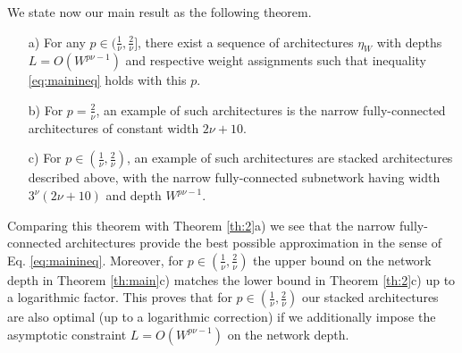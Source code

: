 \documentclass[final, 12pt]{colt2018}
\begin{document}
We state now our main result as the following theorem.

\begin{theorem}\label{th:main}{}\hfill
\begin{enumerate}
\item[a)] 
For any $p\in (\frac{1}{\nu},\frac{2}{\nu}]$, there exist a sequence of architectures $\eta_W$ with depths $L=O(W^{p\nu-1})$ and respective weight assignments such that inequality \eqref{eq:mainineq} holds with this $p$. 
\item[b)] For $p=\frac{2}{\nu}$, an example of such architectures is the  narrow fully-connected architectures of constant width $2\nu+10$.
\item[c)] For $p\in(\frac{1}{\nu},\frac{2}{\nu})$, an example of such architectures are stacked architectures described above, with the narrow fully-connected subnetwork having width $3^\nu(2\nu+10)$ and depth $W^{p\nu-1}$.
\end{enumerate}
\end{theorem}
Comparing this theorem with Theorem \ref{th:2}a) we see that the narrow fully-connected architectures provide the best possible approximation in the sense of Eq. \eqref{eq:mainineq}. Moreover, for $p\in(\frac{1}{\nu}, \frac{2}{\nu})$ the upper bound on the network depth in Theorem \ref{th:main}c) matches the lower bound in Theorem \ref{th:2}c) up to a logarithmic factor. This proves that for $p\in(\frac{1}{\nu}, \frac{2}{\nu})$ our stacked architectures are also optimal (up to a logarithmic correction) if we additionally impose the asymptotic constraint $L=O(W^{p\nu-1})$ on the network depth.      
\end{document}
